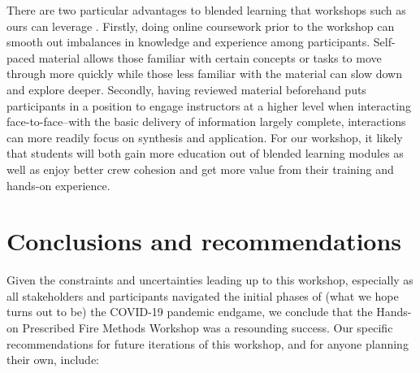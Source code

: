 \documentclass[fire,article,submit,moreauthors,pdftex]{Definitions/mdpi}
\begin{document}
There are two particular advantages to blended learning that workshops such as ours can leverage \citep{cantrell2014}.
Firstly, doing online coursework prior to the workshop can smooth out imbalances in knowledge and experience among participants.
Self-paced material allows those familiar with certain concepts or tasks to move through more quickly while those less familiar with the material can slow down and explore deeper. Secondly, having reviewed material beforehand puts participants in a position to engage instructors at a higher level when interacting face-to-face--with the basic delivery of information largely complete, interactions can more readily focus on synthesis and application.
For our workshop, it likely that students will both gain more education out of blended learning modules as well as enjoy better crew cohesion and get more value from their training and hands-on experience.

\section{Conclusions and recommendations}

Given the constraints and uncertainties leading up to this workshop, especially as all stakeholders and participants navigated the initial phases of (what we hope turns out to be) the COVID-19 pandemic endgame, we conclude that the Hands-on Prescribed Fire Methods Workshop was a resounding success.
Our specific recommendations for future iterations of this workshop, and for anyone planning their own, include: 
\end{document}

